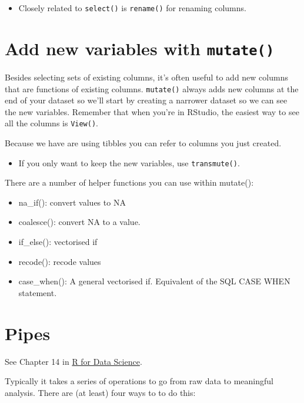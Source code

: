 \documentclass[]{book}
\providecommand{\tightlist}{%
  \setlength{\itemsep}{0pt}\setlength{\parskip}{0pt}}
\newenvironment{rmdblock}[1]
  {\begin{shaded*}
  \begin{itemize}
  \renewcommand{\labelitemi}{
    \raisebox{-.7\height}[0pt][0pt]{
      {\setkeys{Gin}{width=3em,keepaspectratio}\texttt{[image: images/\#1]}}
    }
  }
  \item
  }
  {
  \end{itemize}
  \end{shaded*}
  }
\newenvironment{rmdnote}
  {\begin{rmdblock}{note}}
  {\end{rmdblock}}
\newenvironment{rmdtip}
  {\begin{rmdblock}{tip}}
  {\end{rmdblock}}
\theoremstyle{definition}
\theoremstyle{definition}
\theoremstyle{definition}
\theoremstyle{remark}
\let\BeginKnitrBlock\begin \let\EndKnitrBlock\end
\begin{document}
\begin{rmdnote}
Closely related to \texttt{select()} is \texttt{rename()} for renaming
columns.
\end{rmdnote}

\hypertarget{add-new-variables-with-mutate}{%
\section{\texorpdfstring{Add new variables with
\texttt{mutate()}}{Add new variables with mutate()}}\label{add-new-variables-with-mutate}}

Besides selecting sets of existing columns, it's often useful to add new
columns that are functions of existing columns. \texttt{mutate()} always
adds new columns at the end of your dataset so we'll start by creating a
narrower dataset so we can see the new variables. Remember that when
you're in RStudio, the easiest way to see all the columns is
\texttt{View()}.

Because we have are using tibbles you can refer to columns you just
created.

\begin{rmdtip}
If you only want to keep the new variables, use \texttt{transmute()}.
\end{rmdtip}

There are a number of helper functions you can use within mutate():

\begin{itemize}
\tightlist
\item
  na\_if(): convert values to NA
\item
  coalesce(): convert NA to a value.
\item
  if\_else(): vectorised if
\item
  recode(): recode values
\item
  case\_when(): A general vectorised if. Equivalent of the SQL CASE WHEN
  statement.
\end{itemize}

\hypertarget{pipes}{%
\section{Pipes}\label{pipes}}

\BeginKnitrBlock{rmdimportant}
See Chapter 14 in \href{http://r4ds.had.co.nz/pipes.html}{R for Data
Science}.
\EndKnitrBlock{rmdimportant}

Typically it takes a series of operations to go from raw data to
meaningful analysis. There are (at least) four ways to to do this:
\end{document}
